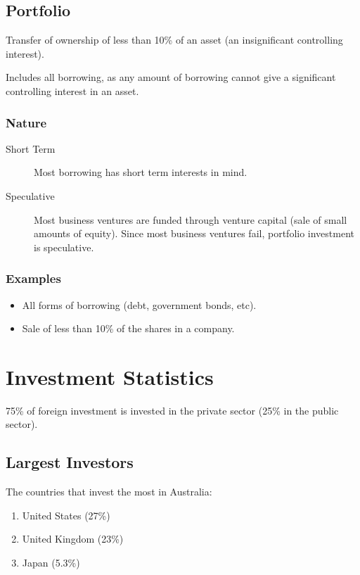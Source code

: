 \documentclass[a4paper,11pt]{article}
\begin{document}
\subsection{Portfolio}

Transfer of ownership of less than 10\% of an asset (an insignificant
controlling interest).

Includes all borrowing, as any amount of borrowing cannot give a significant
controlling interest in an asset.


\subsubsection{Nature}

\begin{description}
\item [Short Term] Most borrowing has short term interests in mind.
\item [Speculative] Most business ventures are funded through venture capital
	(sale of small amounts of equity). Since most business ventures fail,
	portfolio investment is speculative.
\end{description}


\subsubsection{Examples}

\begin{itemize}
\item All forms of borrowing (debt, government bonds, etc).
\item Sale of less than 10\% of the shares in a company.
\end{itemize}




\section{Investment Statistics}

75\% of foreign investment is invested in the private sector (25\% in the
public sector).


\subsection{Largest Investors}

The countries that invest the most in Australia:

\begin{enumerate}
\item United States (27\%)
\item United Kingdom (23\%)
\item Japan (5.3\%)
\end{enumerate}
\end{document}
